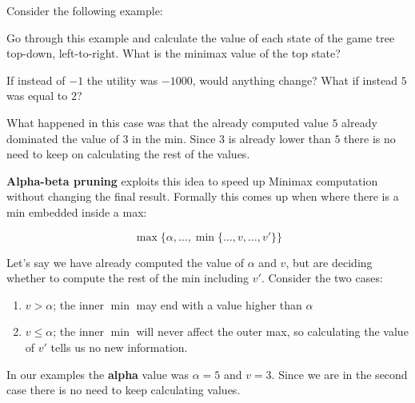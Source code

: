 \documentclass[11pt]{article}
\begin{document}
Consider the following example:

\vspace{1cm}




  \begin{exercise}
    Go through this example and calculate the value of each state of the game tree top-down, left-to-right.
    What is the minimax value of the top state?
  \end{exercise}
\censor{}

  \begin{exercise}
    If instead of $-1$ the utility was $-1000$, would anything change? What if instead $5$ was equal to $2$?
  \end{exercise}
\censor{}

What happened in this case was that the already computed value $5$ already dominated the value of $3$ in the min. Since $3$ is already lower than $5$ there is no need to keep on calculating the rest of the values. 

\textbf{Alpha-beta pruning} exploits this idea to speed up Minimax computation without changing the final result. Formally this comes up when where there is a min embedded inside a max:

\[ \max\{ \alpha, \ldots,  \min\{\ldots, v, \ldots, v' \} \}\]
  
\noindent Let's say we have already computed the value of $\alpha$ and $v$, but are deciding whether to compute the rest of the min including $v'$. Consider the two cases:

\begin{enumerate}
\item  $v > \alpha$; the inner $\min$ may end with a value higher than $\alpha$ 
\item  $v \leq \alpha$; the inner $\min$ will never affect the outer max, so calculating the value of $v'$ tells us no new information. 
\end{enumerate}

In our examples the \textbf{alpha} value was $\alpha = 5$ and $v=3$. Since we are in the second case there is no need to keep calculating values.
\end{document}
